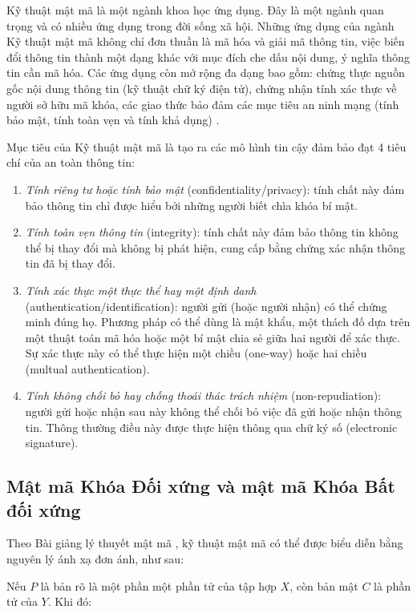 Kỹ thuật mật mã là một ngành khoa học ứng dụng. Đây là một ngành quan trọng và có nhiều ứng dụng trong đời sống xã hội. Những ứng dụng của ngành Kỹ thuật mật mã không chỉ đơn thuần là mã hóa và giải mã thông tin, việc biến đổi thông tin thành một dạng khác với mục đích che dấu nội dung, ý nghĩa thông tin cần mã hóa. Các ứng dụng còn mở rộng đa dạng bao gồm: chứng thực nguồn gốc nội dung thông tin (kỹ thuật chữ ký điện tử), chứng nhận tính xác thực về người sở hữu mã khóa, các giao thức bảo đảm các mục tiêu an ninh mạng (tính bảo mật, tính toàn vẹn và tính khả dụng) \cite{dothanhnghi2018}.

Mục tiêu của Kỹ thuật mật mã là tạo ra các mô hình tin cậy đảm bảo đạt 4 tiêu chí của an toàn thông tin:

\begin{enumerate}

\item  \emph{Tính riêng tư hoặc tính bảo mật} (confidentiality/privacy): tính chất này đảm bảo thông tin chỉ được hiểu bởi những người biết chìa khóa bí mật.
\item \emph{Tính toàn vẹn thông tin} (integrity): tính chất này đảm bảo thông tin không thể bị thay đổi mà không bị phát hiện, cung cấp bằng chứng xác nhận thông tin đã bị thay đổi.
\item \emph{Tính xác thực một thực thể hay một định danh} (authentication/identification): người gửi (hoặc người nhận) có thể chứng minh đúng họ. Phương pháp có thể dùng là mật khẩu, một thách đố dựa trên một thuật toán mã hóa hoặc một bí mật chia sẻ giữa hai người để xác thực. Sự xác thực này có thể thực hiện một chiều (one-way) hoặc hai chiều (multual authentication).
\item \emph{Tính không chối bỏ hay chống thoái thác trách nhiệm} (non-repudiation): người gửi hoặc nhận sau này không thể chối bỏ việc đã gửi hoặc nhận thông tin. Thông thường điều này được thực hiện thông qua chữ ký số (electronic signature).

\end{enumerate}

\subsection{Mật mã Khóa Đối xứng và mật mã Khóa Bất đối xứng}

Theo Bài giảng lý thuyết mật mã \cite{lequyetthang2016}, kỹ thuật mật mã có thể được biểu diễn bằng nguyên lý ánh xạ đơn ánh, như sau:

Nếu $P$ là bản rõ là một phần một phần tử của tập hợp $X$, còn bản mật $C$ là phần tử của $Y$. Khi đó:

